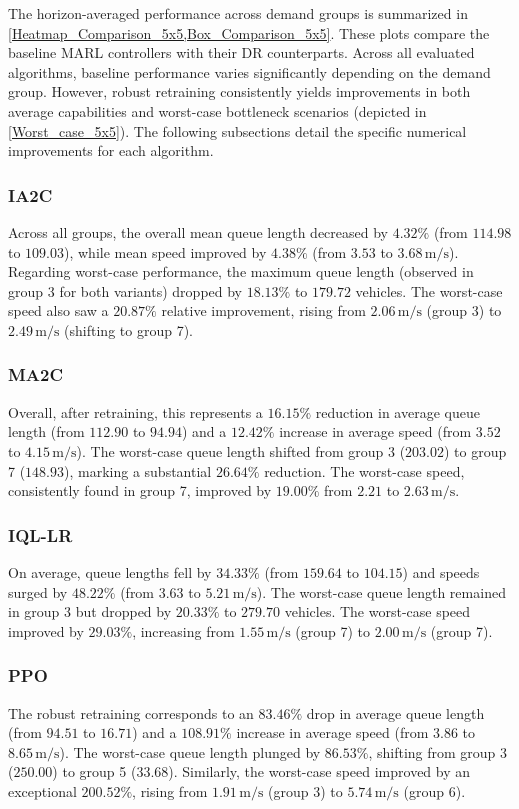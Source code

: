 \documentclass[lettersize,journal]{IEEEtran}
\begin{document}
The horizon-averaged performance across demand groups is summarized in \cref{Heatmap_Comparison_5x5,Box_Comparison_5x5}. These plots compare the baseline MARL controllers with their DR counterparts. Across all evaluated algorithms, baseline performance varies significantly depending on the demand group. However, robust retraining consistently yields improvements in both average capabilities and worst-case bottleneck scenarios (depicted in \cref{Worst_case_5x5}). The following subsections detail the specific numerical improvements for each algorithm.

\subsubsection{IA2C}
Across all groups, the overall mean queue length decreased by $4.32\%$ (from $114.98$ to $109.03$), while mean speed improved by $4.38\%$ (from $3.53$ to $3.68\,\mathrm{m/s}$). Regarding worst-case performance, the maximum queue length (observed in group 3 for both variants) dropped by $18.13\%$ to $179.72$ vehicles. The worst-case speed also saw a $20.87\%$ relative improvement, rising from $2.06\,\mathrm{m/s}$ (group 3) to $2.49\,\mathrm{m/s}$ (shifting to group 7).

\subsubsection{MA2C}
Overall, after retraining, this represents a $16.15\%$ reduction in average queue length (from $112.90$ to $94.94$) and a $12.42\%$ increase in average speed (from $3.52$ to $4.15\,\mathrm{m/s}$). The worst-case queue length shifted from group 3 ($203.02$) to group 7 ($148.93$), marking a substantial $26.64\%$ reduction. The worst-case speed, consistently found in group 7, improved by $19.00\%$ from $2.21$ to $2.63\,\mathrm{m/s}$.

\subsubsection{IQL-LR}
On average, queue lengths fell by $34.33\%$ (from $159.64$ to $104.15$) and speeds surged by $48.22\%$ (from $3.63$ to $5.21\,\mathrm{m/s}$). The worst-case queue length remained in group 3 but dropped by $20.33\%$ to $279.70$ vehicles. The worst-case speed improved by $29.03\%$, increasing from $1.55\,\mathrm{m/s}$ (group 7) to $2.00\,\mathrm{m/s}$ (group 7).

\subsubsection{PPO}
The robust retraining corresponds to an $83.46\%$ drop in average queue length (from $94.51$ to $16.71$) and a $108.91\%$ increase in average speed (from $3.86$ to $8.65\,\mathrm{m/s}$). The worst-case queue length plunged by $86.53\%$, shifting from group 3 ($250.00$) to group 5 ($33.68$). Similarly, the worst-case speed improved by an exceptional $200.52\%$, rising from $1.91\,\mathrm{m/s}$ (group 3) to $5.74\,\mathrm{m/s}$ (group 6). 
\end{document}
